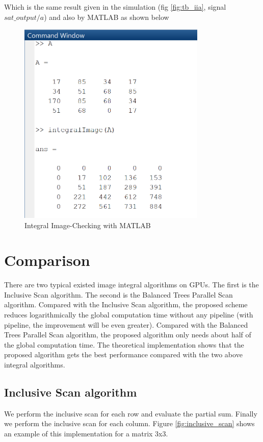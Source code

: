      Which is the same result given in the simulation (fig \ref{fig:tb_iia}, signal $ sat\_output/a $) and also by MATLAB as shown below
      \begin{figure}[h!]
      	\centering	
      	\includegraphics[width=0.8\textwidth]{imm/iia/iia_mat.png}  
      	\caption{Integral Image-Checking with MATLAB} 
      	\label{fig:iia_mat}
      \end{figure}
 \clearpage
 \section{Comparison}
 There are two typical existed image integral algorithms on GPUs. The first is the Inclusive Scan algorithm. The second is the Balanced Trees Parallel Scan algorithm. Compared with the Inclusive Scan algorithm, the proposed scheme reduces logarithmically the global computation time without any pipeline (with pipeline, the improvement will be even greater). Compared with the Balanced Trees Parallel Scan algorithm, the proposed algorithm only needs about half of the global computation time.
 The theoretical implementation shows that the proposed algorithm gets the best performance compared with the two above integral algorithms.
 
 
 \subsection{Inclusive Scan algorithm}
 We perform the inclusive scan for each row and evaluate the partial sum.
 Finally we perform the inclusive scan for each column.
 Figure \ref{fig:inclusive_scan} shows an example of this implementation for a matrix 3x3. \cite{sat3}
 
